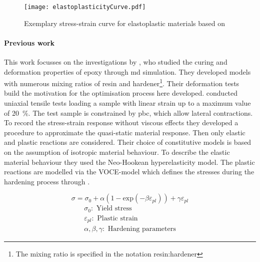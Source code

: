 \begin{figure}[H]
    \centering
    \texttt{[image: elastoplasticityCurve.pdf]}
    \caption{Exemplary stress-strain curve for elastoplastic materials based on \cite{mergheim_lecture_nodate}}
    \label{fig:elastoplasticityCurve}
\end{figure}




\paragraph{Previous work}
This work focusses on the investigations by \citet{ries_deciphering_nodate}, who studied the curing and deformation properties of epoxy through \acrshort{md} simulation. They developed models with numerous mixing ratios of resin and hardener\footnote{The mixing ratio is specified in the notation resin:hardener}. Their deformation tests build the motivation for the optimisation process here developed. \citet{ries_deciphering_nodate} conducted uniaxial tensile tests loading a sample with linear strain up to a maximum value of 20 \%. The test sample is constrained by \acrshort{pbc}, which allow lateral contractions. To record the stress-strain response without viscous effects they developed a procedure to approximate the quasi-static material response. Then only elastic and plastic reactions are considered. Their choice of constitutive models is based on the assumption of isotropic material behaviour. To describe the elastic material behaviour they used the Neo-Hookean hyperelasticity model. The plastic reactions are modelled via the VOCE-model which defines the stresses during the hardening process through \cite{voce_practical_1948}.

\begin{equation} \label{eq: voce}
    \sigma = \sigma_0 + \alpha(1 - \text{exp}(-\beta \varepsilon_{pl})) + \gamma \varepsilon_{pl}
\end{equation}
\begin{gather*}
    \sigma_0: \text{ Yield stress} \\
    \varepsilon_{pl}: \text{ Plastic strain} \\
    \alpha, \beta,  \gamma: \text{ Hardening parameters}
\end{gather*}


